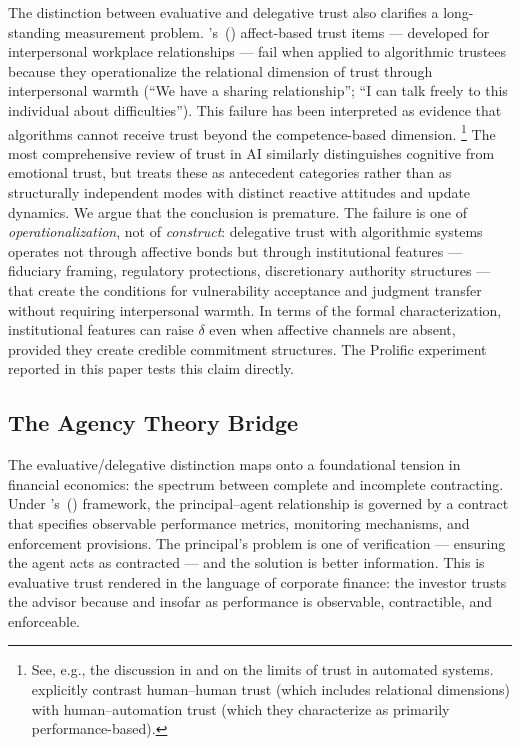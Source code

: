 The distinction between evaluative and delegative trust also clarifies a long-standing measurement problem. \citeauthor{McAllister1995}'s~(\citeyear{McAllister1995}) affect-based trust items --- developed for interpersonal workplace relationships --- fail when applied to algorithmic trustees because they operationalize the relational dimension of trust through interpersonal warmth (``We have a sharing relationship''; ``I can talk freely to this individual about difficulties''). This failure has been interpreted as evidence that algorithms cannot receive trust beyond the competence-based dimension.%
\footnote{See, e.g., the discussion in \citet{LeeSee2004} and \citet{Muir1994} on the limits of trust in automated systems. \citet{MadhavanWiegmann2007} explicitly contrast human--human trust (which includes relational dimensions) with human--automation trust (which they characterize as primarily performance-based).} The most comprehensive review of trust in AI \citep{GliksonWoolley2020} similarly distinguishes cognitive from emotional trust, but treats these as antecedent categories rather than as structurally independent modes with distinct reactive attitudes and update dynamics. We argue that the conclusion is premature. The failure is one of \textit{operationalization}, not of \textit{construct}: delegative trust with algorithmic systems operates not through affective bonds but through institutional features --- fiduciary framing, regulatory protections, discretionary authority structures --- that create the conditions for vulnerability acceptance and judgment transfer without requiring interpersonal warmth. In terms of the formal characterization, institutional features can raise $\delta$ even when affective channels are absent, provided they create credible commitment structures. The Prolific experiment reported in this paper tests this claim directly.


\subsection{The Agency Theory Bridge}
\label{subsec:agency_bridge}

The evaluative/delegative distinction maps onto a foundational tension in financial economics: the spectrum between complete and incomplete contracting. Under \citeauthor{JensenMeckling1976}'s~(\citeyear{JensenMeckling1976}) framework, the principal--agent relationship is governed by a contract that specifies observable performance metrics, monitoring mechanisms, and enforcement provisions. The principal's problem is one of verification --- ensuring the agent acts as contracted --- and the solution is better information. This is evaluative trust rendered in the language of corporate finance: the investor trusts the advisor because and insofar as performance is observable, contractible, and enforceable.

